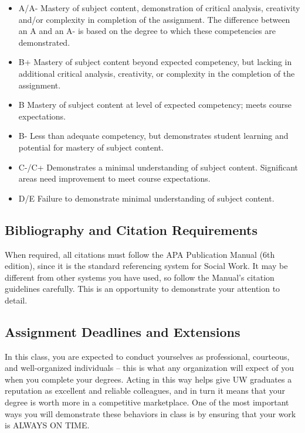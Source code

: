 \documentclass[11pt,]{article}
\providecommand{\tightlist}{%
  \setlength{\itemsep}{0pt}\setlength{\parskip}{0pt}}
\begin{document}
\begin{itemize}
\tightlist
\item
  A/A- Mastery of subject content, demonstration of critical analysis,
  creativity and/or complexity in completion of the assignment. The
  difference between an A and an A- is based on the degree to which
  these competencies are demonstrated.
\item
  B+ Mastery of subject content beyond expected competency, but lacking
  in additional critical analysis, creativity, or complexity in the
  completion of the assignment.
\item
  B Mastery of subject content at level of expected competency; meets
  course expectations.
\item
  B- Less than adequate competency, but demonstrates student learning
  and potential for mastery of subject content.
\item
  C-/C+ Demonstrates a minimal understanding of subject content.
  Significant areas need improvement to meet course expectations.
\item
  D/E Failure to demonstrate minimal understanding of subject content.
\end{itemize}

\subsection{Bibliography and Citation
Requirements}\label{bibliography-and-citation-requirements}

When required, all citations must follow the APA Publication Manual (6th
edition), since it is the standard referencing system for Social Work.
It may be different from other systems you have used, so follow the
Manual's citation guidelines carefully. This is an opportunity to
demonstrate your attention to detail.

\subsection{Assignment Deadlines and
Extensions}\label{assignment-deadlines-and-extensions}

In this class, you are expected to conduct yourselves as professional,
courteous, and well-organized individuals -- this is what any
organization will expect of you when you complete your degrees. Acting
in this way helps give UW graduates a reputation as excellent and
reliable colleagues, and in turn it means that your degree is worth more
in a competitive marketplace. One of the most important ways you will
demonstrate these behaviors in class is by ensuring that your work is
ALWAYS ON TIME.
\end{document}
